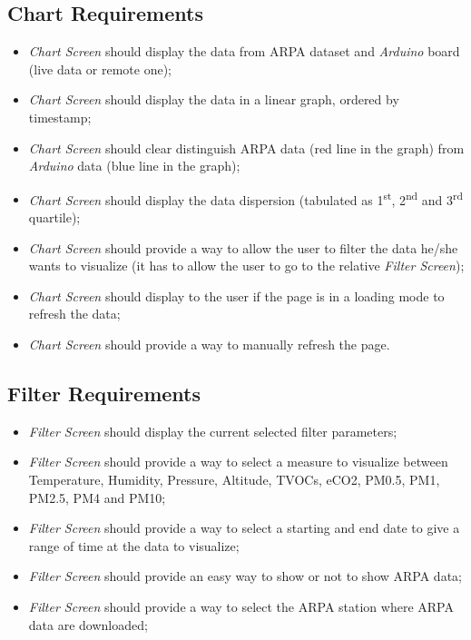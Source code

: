 \subsection{Chart Requirements}
\begin{itemize}
    \item \textit{Chart Screen} should display the data from ARPA dataset and \textit{Arduino} board (live data or remote one);
    \item \textit{Chart Screen} should display the data in a linear graph, ordered by timestamp;
    \item \textit{Chart Screen} should clear distinguish ARPA data (red line in the graph) from \textit{Arduino} data (blue line in the graph);
    \item \textit{Chart Screen} should display the data dispersion (tabulated as 1\textsuperscript{st}, 2\textsuperscript{nd} and 3\textsuperscript{rd} quartile);
    \item \textit{Chart Screen} should provide a way to allow the user to filter the data he/she wants to visualize (it has to allow the user to go to the relative \textit{Filter Screen});
    \item \textit{Chart Screen} should display to the user if the page is in a loading mode to refresh the data;
    \item \textit{Chart Screen} should provide a way to manually refresh the page.
\end{itemize}
    
\subsection{Filter Requirements}
\begin{itemize}
    \item \textit{Filter Screen} should display the current selected filter parameters;
    \item \textit{Filter Screen} should provide a way to select a measure to visualize between Temperature, Humidity, Pressure, Altitude, TVOCs, eCO2, PM0.5, PM1, PM2.5, PM4 and PM10;
    \item \textit{Filter Screen} should provide a way to select a starting and end date to give a range of time at the data to visualize;
    \item \textit{Filter Screen} should provide an easy way to show or not to show ARPA data;
    \item \textit{Filter Screen} should provide a way to select the ARPA station where ARPA data are downloaded;
\end{itemize}
    
